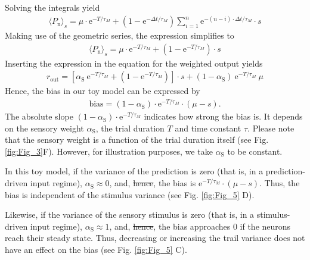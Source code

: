 \documentclass[10pt,a4paper]{article}
\providecommand{\DIFaddtex}[1]{{\protect\color{blue}\uwave{#1}}} %
\providecommand{\DIFdeltex}[1]{{\protect\color{red}\sout{#1}}}                      %
\providecommand{\DIFaddbegin}{} %
\providecommand{\DIFaddend}{} %
\providecommand{\DIFdelbegin}{} %
\providecommand{\DIFdelend}{} %
\providecommand{\DIFadd}[1]{\texorpdfstring{\DIFaddtex{#1}}{#1}} %
\providecommand{\DIFdel}[1]{\texorpdfstring{\DIFdeltex{#1}}{}} %
\newcommand{\DIFscaledelfig}{0.5}
\newlength{\DIFdelgraphicswidth} %
\newlength{\DIFdelgraphicsheight} %
\newcommand{\DIFaddincludegraphics}[2][]{{\color{blue}\fbox{\DIFOincludegraphics[#1]{#2}}}} %
\newcommand{\DIFdelincludegraphics}[2][]{%
\sbox{\DIFdelgraphicsbox}{\DIFOincludegraphics[#1]{#2}}%
\settoboxwidth{\DIFdelgraphicswidth}{\DIFdelgraphicsbox} %
\settoboxtotalheight{\DIFdelgraphicsheight}{\DIFdelgraphicsbox} %
\scalebox{\DIFscaledelfig}{%
\parbox[b]{\DIFdelgraphicswidth}{\usebox{\DIFdelgraphicsbox}\\[-\baselineskip] \rule{\DIFdelgraphicswidth}{0em}}\llap{\resizebox{\DIFdelgraphicswidth}{\DIFdelgraphicsheight}{%
\setlength{\unitlength}{\DIFdelgraphicswidth}%
\begin{picture}(1,1)%
\thicklines\linethickness{2pt} %
{\color[rgb]{1,0,0}\put(0,0){\framebox(1,1){}}}%
{\color[rgb]{1,0,0}\put(0,0){\line( 1,1){1}}}%
{\color[rgb]{1,0,0}\put(0,1){\line(1,-1){1}}}%
\end{picture}%
}\hspace*{3pt}}} %
} %
\DeclareRobustCommand{\DIFaddbegin}{\DIFOaddbegin \let\includegraphics\DIFaddincludegraphics} %
\DeclareRobustCommand{\DIFaddend}{\DIFOaddend \let\includegraphics\DIFOincludegraphics} %
\DeclareRobustCommand{\DIFdelbegin}{\DIFOdelbegin \let\includegraphics\DIFdelincludegraphics} %
\DeclareRobustCommand{\DIFdelend}{\DIFOaddend \let\includegraphics\DIFOincludegraphics} %
\begin{document}
%
Solving the integrals yield
%
\begin{align}
\langle P_\mathrm{n} \rangle_s = \mu \cdot \mathrm{e}^{-T/\tau_M} + \left( 1 -   \mathrm{e}^{-\Delta t/\tau_M} \right) \sum_{i=1}^{n} \mathrm{e}^{-(n-i)\cdot \Delta t/ \tau_M} \cdot s
\end{align}
%
Making use of the geometric series, the expression simplifies to
%
\begin{align*}
\langle P_\mathrm{n} \rangle_s =  \mu \cdot \mathrm{e}^{-T/\tau_M} + \left( 1 -   \mathrm{e}^{-T/\tau_M} \right) \cdot s
\end{align*}
%
Inserting the expression in the equation for the weighted output yields
%
\begin{align*}
 r_\mathrm{out} = \left[ \alpha_\mathrm{S}\  \mathrm{e}^{-T/\tau_M} + \left( 1 -   \mathrm{e}^{-T/\tau_M} \right)\right] \cdot s + \left( 1 -\alpha_\mathrm{S} \right)\ \mathrm{e}^{-T/\tau_M}\ \mu
\end{align*}
%
Hence, the bias in our toy model can be expressed by
%
\begin{align*}
 \mathrm{bias} = \left( 1 -\alpha_\mathrm{S} \right)\cdot \mathrm{e}^{-T/\tau_M}\cdot \left(\mu - s \right).
\end{align*}
%
The absolute slope $\left( 1 -\alpha_\mathrm{S} \right)\cdot \mathrm{e}^{-T/\tau_M}$ indicates how strong the bias is. It depends on the sensory weight $\alpha_\mathrm{S}$, the trial duration $T$ and time constant \DIFdelbegin \DIFdel{$\tau$}\DIFdelend \DIFaddbegin \DIFadd{$\tau_M$}\DIFaddend . Please note that the sensory weight is a function of the trial duration itself (see Fig. \ref{fig:Fig_3}F). However, for illustration purposes, we take $\alpha_\mathrm{S}$ to be constant.

In this toy model, if the variance of the prediction is zero (that is, in a prediction-driven input regime), $\alpha_\mathrm{S} \approx 0$, and, \DIFdelbegin \DIFdel{hence}\DIFdelend \DIFaddbegin \DIFadd{consequently}\DIFaddend , the bias is $\mathrm{e}^{-T/\tau_M}\cdot \left(\mu - s \right)$. Thus, the bias is independent of the stimulus variance (see Fig. \ref{fig:Fig_5} D).

Likewise, if the variance of the sensory stimulus is zero (that is, in a stimulus-driven input regime), $\alpha_\mathrm{S} \approx 1$, and, \DIFdelbegin \DIFdel{hence}\DIFdelend \DIFaddbegin \DIFadd{consequently}\DIFaddend , the bias approaches $0$ if the neurons reach their steady state. Thus, decreasing or increasing the trail variance does not have an effect on the bias (see Fig. \ref{fig:Fig_5} C).
\end{document}

